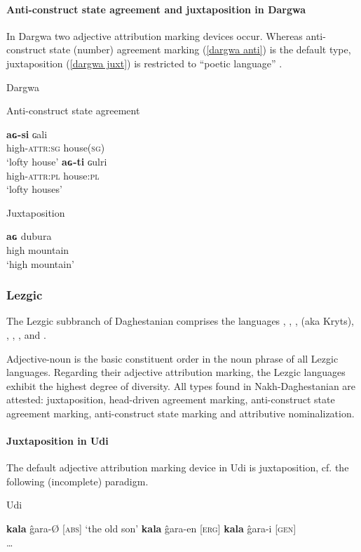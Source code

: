 \paragraph{Anti-construct state agreement and juxtaposition in Dargwa} In Dargwa two adjective attribution marking devices occur. Whereas anti-construct state (number) agreement marking (\ref{dargwa anti}) is the default type, juxtaposition (\ref{dargwa juxt}) is restricted to “poetic language” \citep[318]{isaev2004}.
\begin{exe}
\ex 
\rm{Dargwa \citep[318]{isaev2004}}
\begin{xlist}
\ex 
\label{dargwa anti}
\rm{Anti-construct state agreement} 
\begin{xlist}
\ex
\gll	\textbf{aɢ-si} ɢali\\
	high-\textsc{attr:sg} house(\textsc{sg})\\
\glt	‘lofty house’
\ex
\gll	\textbf{aɢ-ti} ɢulri\\
	high-\textsc{attr:pl} house:\textsc{pl}\\
\glt	‘lofty houses’
\end{xlist}

\ex
\label{dargwa juxt}
\rm{Juxtaposition}
\begin{xlist}
\ex
\gll	\textbf{aɢ} dubura\\
	high mountain\\
\glt	‘high mountain’
\end{xlist}
\end{xlist}
\end{exe}

\subsubsection{Lezgic}\label{lezgian synchr}
The Lezgic subbranch of Daghestanian comprises the languages , , ,  (aka Kryts), , , ,  and .

Adjective-noun is the basic constituent order in the noun phrase of all Lezgic languages. Regarding their adjective attribution marking, the Lezgic languages exhibit the highest degree of diversity. All types found in Nakh-Daghestanian are attested: juxtaposition, head-driven agreement marking, anti-construct state agreement marking, anti-construct state marking and attributive nominalization.

\paragraph{Juxtaposition in Udi}
The default adjective attribution marking device in Udi is juxtaposition, cf. the following (incomplete) paradigm.
\begin{exe}
\ex 
\rm{Udi \citep[465]{schulze-furhoff1994}}
\begin{xlist}
\ex \textbf{kala} ĝara-Ø	\rm{[\textsc{abs}] ‘the old son’}
\ex \textbf{kala} ĝara-en	\rm{[\textsc{erg}]}
\ex \textbf{kala} ĝara-i	\rm{[\textsc{gen}]}\\
\dots
\end{xlist}
\end{exe}

